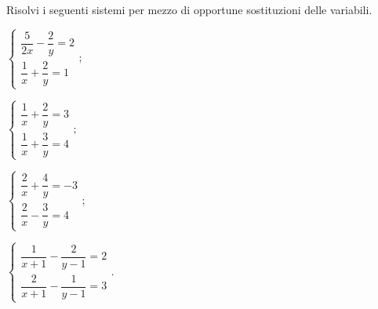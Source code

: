 \begin{esercizio}[\Ast]
 \label{ese:22.65}
 Risolvi i seguenti sistemi per mezzo di opportune sostituzioni delle variabili.
\begin{multicols}{2}
\begin{enumeratea}
{\longarray
\item $\left\{\begin{array}{l}\dfrac{5}{2x}-\dfrac{2}{y}=2\\\dfrac{1}{x}+\dfrac{2}{y}=1\end{array}\right.;$
\item $\left\{\begin{array}{l}\dfrac{1}{x}+\dfrac{2}{y}=3\\\dfrac{1}{x}+\dfrac{3}{y}=4\end{array}\right.;$
\item $\left\{\begin{array}{l}\dfrac{2}{x}+\dfrac{4}{y}=-3\\\dfrac{2}{x}-\dfrac{3}{y}=4 \end{array}\right.;$
\item $\left\{\begin{array}{l}\dfrac{1}{x+1}-\dfrac{2}{y-1}=2\\\dfrac{2}{x+1}-\dfrac{1}{y-1}=3\end{array}\right..$}
\end{enumeratea}
\end{multicols}
\end{esercizio}

